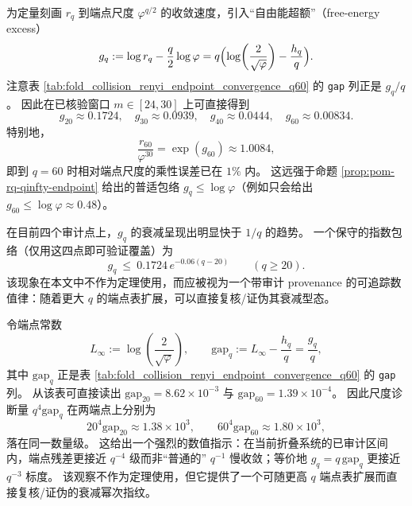 \begin{remark}\label{rem:pom-free-energy-excess-gq}
为定量刻画 \(r_q\) 到端点尺度 \(\varphi^{q/2}\) 的收敛速度，引入“自由能超额”（free-energy excess）
\[
g_q:=\log r_q-\frac{q}{2}\log\varphi
= q\Bigl(\log\!\left(\frac{2}{\sqrt{\varphi}}\right)-\frac{h_q}{q}\Bigr).
\]
注意表 \ref{tab:fold_collision_renyi_endpoint_convergence_q60} 的 \texttt{gap} 列正是 \(g_q/q\)。
因此在已核验窗口 \(m\in[24,30]\) 上可直接得到
\[
g_{20}\approx 0.1724,\quad g_{30}\approx 0.0939,\quad g_{40}\approx 0.0444,\quad g_{60}\approx 0.00834.
\]
特别地，
\[
\frac{r_{60}}{\varphi^{30}}=\exp(g_{60})\approx 1.0084,
\]
即到 \(q=60\) 时相对端点尺度的乘性误差已在 \(1\%\) 内。
这远强于命题 \ref{prop:pom-rq-qinfty-endpoint} 给出的普适包络 \(g_q\le \log\varphi\)（例如只会给出 \(g_{60}\le\log\varphi\approx 0.48\)）。
\par
在目前四个审计点上，\(g_q\) 的衰减呈现出明显快于 \(1/q\) 的趋势。
一个保守的指数包络（仅用这四点即可验证覆盖）为
\[
g_q\ \le\ 0.1724\,e^{-0.06(q-20)}\qquad(q\ge 20).
\]
该现象在本文中不作为定理使用，而应被视为一个带审计 provenance 的可追踪数值律：随着更大 \(q\) 的端点表扩展，可以直接复核/证伪其衰减型态。
\end{remark}

\begin{remark}\label{rem:pom-endpoint-gap-qminus4}
令端点常数
\[
L_\infty:=\log\!\left(\frac{2}{\sqrt{\varphi}}\right),
\qquad
\mathrm{gap}_q:=L_\infty-\frac{h_q}{q}=\frac{g_q}{q},
\]
其中 \(\mathrm{gap}_q\) 正是表 \ref{tab:fold_collision_renyi_endpoint_convergence_q60} 的 \texttt{gap} 列。
从该表可直接读出
\(
\mathrm{gap}_{20}=8.62\times 10^{-3}
\)
与
\(
\mathrm{gap}_{60}=1.39\times 10^{-4}
\)。
因此尺度诊断量
\(
q^4\mathrm{gap}_q
\)
在两端点上分别为
\[
20^4\mathrm{gap}_{20}\approx 1.38\times 10^3,
\qquad
60^4\mathrm{gap}_{60}\approx 1.80\times 10^3,
\]
落在同一数量级。
这给出一个强烈的数值指示：在当前折叠系统的已审计区间内，端点残差更接近 \(q^{-4}\) 级而非“普通的” \(q^{-1}\) 慢收敛；等价地 \(g_q=q\,\mathrm{gap}_q\) 更接近 \(q^{-3}\) 标度。
该观察不作为定理使用，但它提供了一个可随更高 \(q\) 端点表扩展而直接复核/证伪的衰减幂次指纹。
\end{remark}

